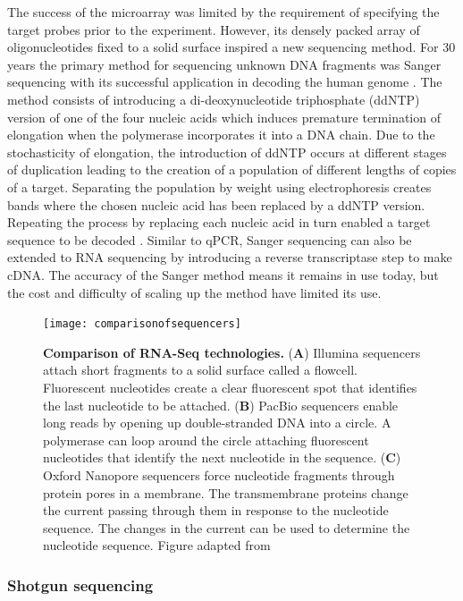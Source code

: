 \documentclass[../main.tex]{subfiles}
\begin{document}
The success of the microarray was limited by the requirement of specifying the target probes prior to the experiment.
However, its densely packed array of oligonucleotides fixed to a solid surface inspired a new sequencing method.
For 30 years the primary method for sequencing unknown DNA fragments was Sanger sequencing with its successful application in decoding the human genome \parencite{Lander2001}. 
The method consists of introducing a di-deoxynucleotide triphosphate (ddNTP) version of one of the four nucleic acids which induces premature termination of elongation when the polymerase incorporates it into a DNA chain.
Due to the stochasticity of elongation, the introduction of ddNTP occurs at different stages of duplication leading to the creation of a population of different lengths of copies of a target.
Separating the population by weight using electrophoresis creates bands where the chosen nucleic acid has been replaced by a ddNTP version.
Repeating the process by replacing each nucleic acid in turn enabled a target sequence to be decoded \parencite{Sanger1977}.
Similar to qPCR, Sanger sequencing can also be extended to RNA sequencing by introducing a reverse transcriptase step to make cDNA.
The accuracy of the Sanger method means it remains in use today, but the cost and difficulty of scaling up the method have limited its use.

\begin{figure}[h]

{\centering \texttt{[image: comparisonofsequencers]} 

}

\caption[Comparison of RNA-Seq technologies.]{\textbf{Comparison of RNA-Seq technologies.} (\textbf{A}) Illumina sequencers attach short fragments to a solid surface called a flowcell. Fluorescent nucleotides create a clear fluorescent spot that identifies the last nucleotide to be attached. (\textbf{B}) PacBio sequencers enable long reads by opening up double-stranded DNA into a circle. A polymerase can loop around the circle attaching fluorescent nucleotides that identify the next nucleotide in the sequence. (\textbf{C}) Oxford Nanopore sequencers force nucleotide fragments through protein pores in a membrane. The transmembrane proteins change the current passing through them in response to the nucleotide sequence. The changes in the current can be used to determine the nucleotide sequence. Figure adapted from \cite{Stark2019}}\label{fig:rna-seq-tech}
\end{figure}

\subsubsection{Shotgun sequencing}
\end{document}
